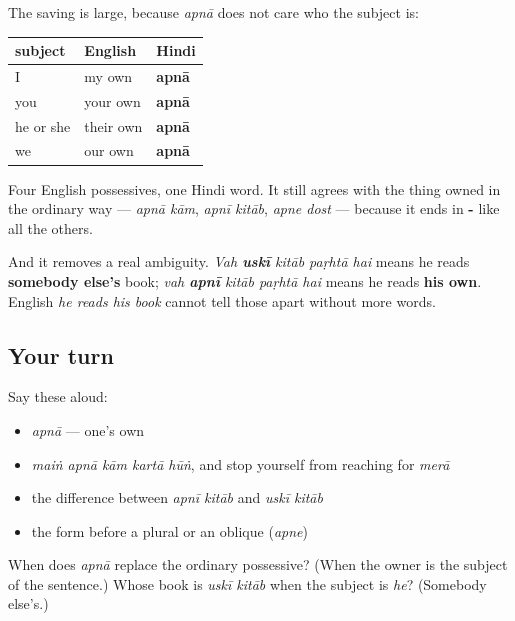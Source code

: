 \begin{grammarlens}[title={Grammar Lens: one word covering every person}]
The saving is large, because \emph{apnā} does not care who the subject is:

\noindent
\begin{tabularx}{\linewidth}{@{}>{\raggedright\arraybackslash}X>{\raggedright\arraybackslash}X>{\raggedright\arraybackslash}X@{}}
\toprule
\textbf{subject} & \textbf{English} & \textbf{Hindi} \\
\midrule
I & my own & \textbf{apnā} \\
you & your own & \textbf{apnā} \\
he or she & their own & \textbf{apnā} \\
we & our own & \textbf{apnā} \\
\bottomrule
\end{tabularx}

Four English possessives, one Hindi word. It still agrees with the thing owned in the ordinary way — \emph{apnā kām}, \emph{apnī kitāb}, \emph{apne dost} — because it ends in \textbf{-} like all the others.

And it removes a real ambiguity. \emph{Vah \textbf{uskī} kitāb paṛhtā hai} means he reads \textbf{somebody else's} book; \emph{vah \textbf{apnī} kitāb paṛhtā hai} means he reads \textbf{his own}. English \emph{he reads his book} cannot tell those apart without more words.
\end{grammarlens}

\subsection*{Your turn}
Say these aloud:

\begin{itemize}
\raggedright
  \item \emph{apnā} — one's own
  \item \emph{maiṅ apnā kām kartā hūṅ}, and stop yourself from reaching for \emph{merā}
  \item the difference between \emph{apnī kitāb} and \emph{uskī kitāb}
  \item the form before a plural or an oblique (\emph{apne})
\end{itemize}

\begin{tcolorbox}[breakable,colback=teal!4,colframe=teal!35!black,title={Before you move on}]
When does \emph{apnā} replace the ordinary possessive? (When the owner is the subject of the sentence.) Whose book is \emph{uskī kitāb} when the subject is \emph{he}? (Somebody else's.)
\end{tcolorbox}
